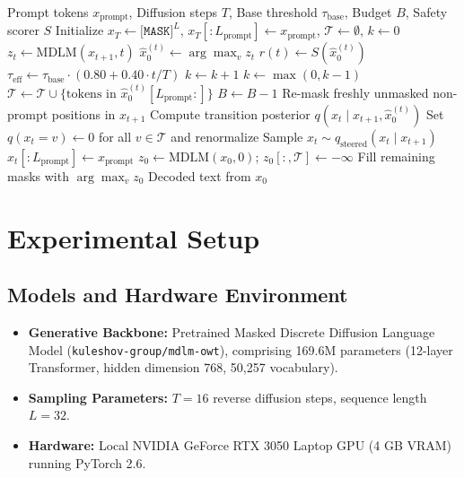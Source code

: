 \documentclass[11pt]{article}
\begin{document}
\begin{algorithm}[t]
\caption{Guard-Trajectory Sampling with Directional Taboo Steering}
\label{alg:guard}
\begin{algorithmic}[1]
\REQUIRE Prompt tokens $x_{\text{prompt}}$, Diffusion steps $T$, Base threshold $\tau_{\text{base}}$, Budget $B$, Safety scorer $S$
\STATE Initialize $x_T \leftarrow \texttt{[MASK]}^L$, $x_T[:L_{\text{prompt}}] \leftarrow x_{\text{prompt}}$, $\mathcal{T} \leftarrow \emptyset$, $k \leftarrow 0$
    \STATE $z_t \leftarrow \text{MDLM}(x_{t+1}, t)$
    \STATE $\hat{x}_0^{(t)} \leftarrow \arg\max_v z_t$
        \STATE $r(t) \leftarrow S(\hat{x}_0^{(t)})$
        \STATE $\tau_{\text{eff}} \leftarrow \tau_{\text{base}} \cdot (0.80 + 0.40 \cdot t/T)$
            \STATE $k \leftarrow k + 1$
        \ELSE
            \STATE $k \leftarrow \max(0, k - 1)$
        \ENDIF
            \STATE $\mathcal{T} \leftarrow \mathcal{T} \cup \{ \text{tokens in } \hat{x}_0^{(t)}[L_{\text{prompt}}:] \}$
            \STATE $B \leftarrow B - 1$
            \STATE Re-mask freshly unmasked non-prompt positions in $x_{t+1}$
        \ENDIF
    \ENDIF
    \STATE Compute transition posterior $q(x_t \mid x_{t+1}, \hat{x}_0^{(t)})$
    \STATE Set $q(x_t = v) \leftarrow 0$ for all $v \in \mathcal{T}$ and renormalize
    \STATE Sample $x_t \sim q_{\text{steered}}(x_t \mid x_{t+1})$
    \STATE $x_t[:L_{\text{prompt}}] \leftarrow x_{\text{prompt}}$
\ENDFOR
{}
    \STATE $z_0 \leftarrow \text{MDLM}(x_0, 0)$; $z_0[:, \mathcal{T}] \leftarrow -\infty$
    \STATE Fill remaining masks with $\arg\max_v z_0$
\ENDIF
\RETURN Decoded text from $x_0$
\end{algorithmic}
\end{algorithm}

\section{Experimental Setup}

\subsection{Models and Hardware Environment}
\begin{itemize}
    \item \textbf{Generative Backbone:} Pretrained Masked Discrete Diffusion Language Model (\texttt{kuleshov-group/mdlm-owt}), comprising 169.6M parameters (12-layer Transformer, hidden dimension 768, 50,257 vocabulary).
    \item \textbf{Sampling Parameters:} $T = 16$ reverse diffusion steps, sequence length $L = 32$.
    \item \textbf{Hardware:} Local NVIDIA GeForce RTX 3050 Laptop GPU (4 GB VRAM) running PyTorch 2.6.
\end{itemize}
\end{document}

